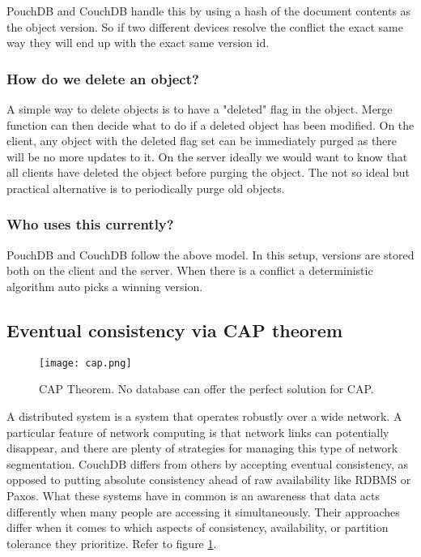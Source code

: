 PouchDB and CouchDB handle this by using a hash of the document contents as the object version. So if two 
different devices resolve the conflict the exact same way they will end up with the exact same version id.

\subsubsection{How do we delete an object?}

A simple way to delete objects is to have a "deleted" flag in the object. 
Merge function can then decide what to do if a deleted object has been modified. 
On the client, any object with the deleted flag set can be immediately purged as 
there will be no more updates to it. On the server ideally we would want to know 
that all clients have deleted the object before purging the object. The not so ideal 
but practical alternative is to periodically purge old objects.

\subsubsection{Who uses this currently?}

PouchDB and CouchDB follow the above model. In this setup, versions are stored both on the client and 
the server. When there is a conflict a deterministic algorithm auto picks a winning version.~\cite{HasuraOfflineFirst}

\subsection{Eventual consistency via CAP theorem}

\begin{figure}[h!]
    \begin{center}
        \texttt{[image: cap.png]}
    \end{center}
    \caption{CAP Theorem. No database can offer the perfect solution for CAP.}
    \label{fig:cap}
\end{figure}

A distributed system is a system that operates robustly over a wide network. 
A particular feature of network computing is that network links can potentially 
disappear, and there are plenty of strategies for managing this type of network 
segmentation. CouchDB differs from others by accepting eventual consistency, 
as opposed to putting absolute consistency ahead of raw availability like 
RDBMS or Paxos. What these systems have in common is an awareness that data 
acts differently when many people are accessing it simultaneously. 
Their approaches differ when it comes to which aspects of consistency, 
availability, or partition tolerance they prioritize. Refer to figure \ref{fig:cap}.

